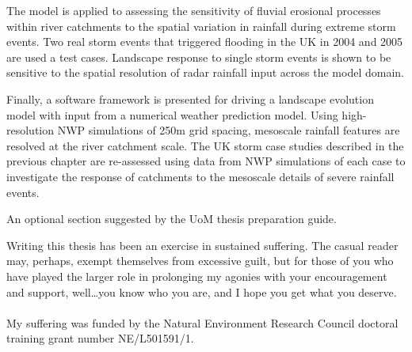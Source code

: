 The model is applied to assessing the sensitivity of fluvial erosional processes within river catchments to the spatial variation in rainfall during extreme storm events. Two real storm events that triggered flooding in the UK in 2004 and 2005 are used a test cases. Landscape response to single storm events is shown to be sensitive to the spatial resolution of radar rainfall input across the model domain.

Finally, a software framework is presented for driving a landscape evolution model with input from a numerical weather prediction model. Using high-resolution NWP simulations of 250m grid spacing, mesoscale rainfall features are resolved at the river catchment scale. The UK storm case studies described in the previous chapter are re-assessed using data from NWP simulations of each case to investigate the response of catchments to the mesoscale details of severe rainfall events.


%
%
%

\afterabstract

An optional section suggested by the UoM thesis preparation guide.

Writing this thesis has been an exercise in sustained suffering. The casual reader may, perhaps, exempt themselves from excessive guilt, but for those of you who have played the larger role in prolonging my agonies with your encouragement and support, well…you know who you are, and I hope you get what you deserve.
\\ \\
My suffering was funded by the Natural Environment Research Council doctoral training grant number NE/L501591/1.
\afterpreface
